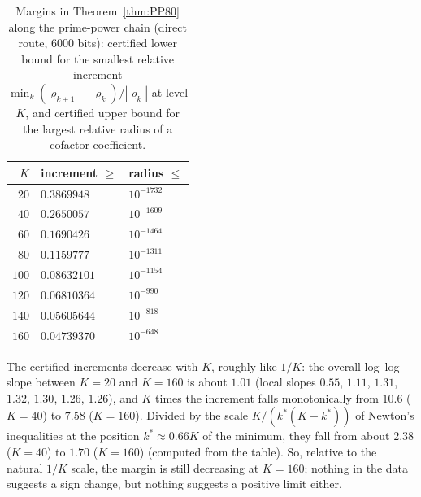 \begin{table}[ht]
\centering\small
\caption{Margins in Theorem~\ref{thm:PP80} along the prime-power chain (direct route, $6000$ bits): certified lower bound
for the smallest relative increment $\min_k(\varrho_{k+1}-\varrho_k)/|\varrho_k|$ at level $K$, and certified upper bound for
the largest relative radius of a cofactor coefficient.}\label{tab:app-PP80}
\begin{tabular}{@{}rll@{}}
\toprule
$K$ & increment $\ge$ & radius $\le$ \\
\midrule
$20$ & $0.3869948$ & $10^{-1732}$ \\
$40$ & $0.2650057$ & $10^{-1609}$ \\
$60$ & $0.1690426$ & $10^{-1464}$ \\
$80$ & $0.1159777$ & $10^{-1311}$ \\
$100$ & $0.08632101$ & $10^{-1154}$ \\
$120$ & $0.06810364$ & $10^{-990}$ \\
$140$ & $0.05605644$ & $10^{-818}$ \\
$160$ & $0.04739370$ & $10^{-648}$ \\
\bottomrule
\end{tabular}
\end{table}

The certified increments decrease with $K$, roughly like $1/K$: the overall log--log slope between $K=20$ and $K=160$ is
about $1.01$ (local slopes $0.55$, $1.11$, $1.31$, $1.32$, $1.30$, $1.26$, $1.26$), and $K$ times the increment falls
monotonically from $10.6$ ($K=40$) to $7.58$ ($K=160$). Divided by the scale $K/(k^*(K-k^*))$ of Newton's inequalities at
the position $k^*\approx0.66K$ of the minimum, they fall from about $2.38$ ($K=40$) to $1.70$ ($K=160$) (computed from
the table). So, relative to the natural $1/K$ scale, the margin is still decreasing at $K=160$; nothing in the data
suggests a sign change, but nothing suggests a positive limit either.


